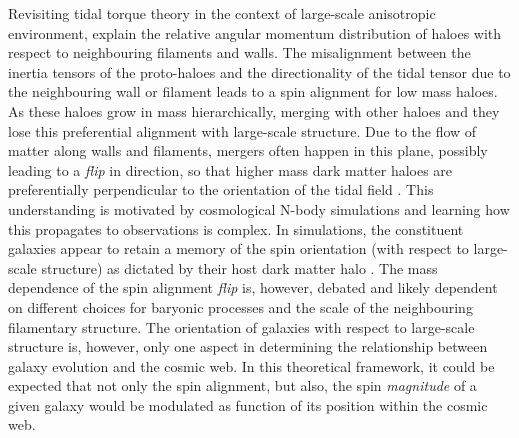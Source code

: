 Revisiting tidal torque theory \citep[TTT; e.g.][]{hoyle1951, peebles1969} in the context of large-scale anisotropic environment, \citet{codis2015} explain the relative angular momentum distribution of haloes with respect to neighbouring filaments and walls. The misalignment between the inertia tensors of the proto-haloes and the directionality of the tidal tensor due to the neighbouring wall or filament leads to a spin alignment for low mass haloes. As these haloes grow in mass hierarchically, merging with other haloes and they lose this preferential alignment with large-scale structure. Due to the flow of matter along walls and filaments, mergers often happen in this plane, possibly leading to a \textit{flip} in direction, so that higher mass dark matter haloes are preferentially perpendicular to the orientation of the tidal field \citep[e.g.][]{Codis2012, dubois2014, GaneshaiahVeena2018}. This understanding is motivated by cosmological N-body simulations and learning how this propagates to observations is complex. In simulations, the constituent galaxies appear to retain a memory of the spin orientation (with respect to large-scale structure) as dictated by their host dark matter halo \citep[e.g.][]{codis2018, Kraljic2019flip}. The mass dependence of the spin alignment \textit{flip} is, however, debated and likely dependent on different choices for baryonic processes and the scale of the neighbouring filamentary structure. The orientation of galaxies with respect to large-scale structure is, however, only one aspect in determining the relationship between galaxy evolution and the cosmic web. In this theoretical framework, it could be expected that not only the spin alignment, but also, the spin \textit{magnitude} of a given galaxy would be modulated as function of its position within the cosmic web.

